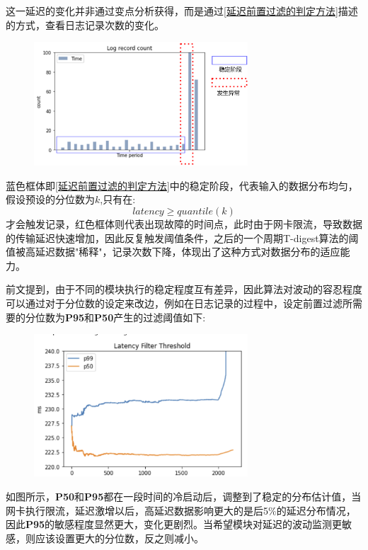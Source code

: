 \documentclass[master,anonymous]{shtthesis}
\begin{document}
这一延迟的变化并非通过变点分析获得，而是通过\ref{延迟前置过滤的判定方法}描述的方式，查看日志记录次数的变化。
\begin{figure}[H]
	\centering
	\includegraphics[width=8cm]{img/error.pdf}
	\label{单位时间次数}
\end{figure}
蓝色框体即\ref{延迟前置过滤的判定方法}中的稳定阶段，代表输入的数据分布均匀，假设预设的分位数为$k$,只有在:
\begin{equation}
	latency \geq quantile(k)
\end{equation}
才会触发记录，红色框体则代表出现故障的时间点，此时由于网卡限流，导致数据的传输延迟快速增加，因此反复触发阈值条件，之后的一个周期T-digest算法的阈值被高延迟数据"稀释"，记录次数下降，体现出了这种方式对数据分布的适应能力。

前文提到，由于不同的模块执行的稳定程度互有差异，因此算法对波动的容忍程度可以通过对于分位数的设定来改边，例如在日志记录的过程中，设定前置过滤所需要的分位数为\textbf{P95}和\textbf{P50}产生的过滤阈值如下:
\begin{figure}[H]
	\centering
	\includegraphics[width=8cm]{img/dp.png}
	\label{不同分位数延迟的过滤阈值}
\end{figure}
如图所示，\textbf{P50}和\textbf{P95}都在一段时间的冷启动后，调整到了稳定的分布估计值，当网卡执行限流，延迟激增以后，高延迟数据影响更大的是后5$\%$的延迟分布情况，因此\textbf{P95}的敏感程度显然更大，变化更剧烈。当希望模块对延迟的波动监测更敏感，则应该设置更大的分位数，反之则减小。
\end{document}
